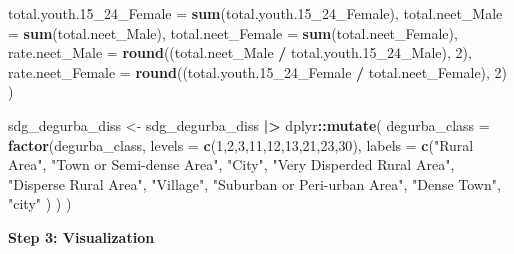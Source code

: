 \documentclass[
]{article}
\newenvironment{Shaded}{\begin{snugshade}}{\end{snugshade}}
\newcommand{\AttributeTok}[1]{\textcolor[rgb]{0.13,0.29,0.53}{#1}}
\newcommand{\DecValTok}[1]{\textcolor[rgb]{0.00,0.00,0.81}{#1}}
\newcommand{\FloatTok}[1]{\textcolor[rgb]{0.00,0.00,0.81}{#1}}
\newcommand{\FunctionTok}[1]{\textcolor[rgb]{0.13,0.29,0.53}{\textbf{#1}}}
\newcommand{\NormalTok}[1]{#1}
\newcommand{\OtherTok}[1]{\textcolor[rgb]{0.56,0.35,0.01}{#1}}
\newcommand{\SpecialCharTok}[1]{\textcolor[rgb]{0.81,0.36,0.00}{\textbf{#1}}}
\newcommand{\StringTok}[1]{\textcolor[rgb]{0.31,0.60,0.02}{#1}}
\newenvironment{UNFPAShadedBox}{%
\begin{tcolorbox}[sharp corners, enhanced, colback=white, boxrule=0pt, borderline west={2pt}{0pt}{orange}]%
}{\end{tcolorbox}}
\newenvironment{Highlighting}{\begin{UNFPAShadedBox}}{\end{UNFPAShadedBox}}
\begin{document}
\begin{Shaded}
\begin{Highlighting}[]
    \AttributeTok{total.youth.15\_24\_Female =} \FunctionTok{sum}\NormalTok{(total.youth}\FloatTok{.15}\NormalTok{\_24\_Female),}
    \AttributeTok{total.neet\_Male =} \FunctionTok{sum}\NormalTok{(total.neet\_Male),}
    \AttributeTok{total.neet\_Female   =} \FunctionTok{sum}\NormalTok{(total.neet\_Female),}
    \AttributeTok{rate.neet\_Male =} \FunctionTok{round}\NormalTok{((total.neet\_Male }\SpecialCharTok{/}\NormalTok{ total.youth}\FloatTok{.15}\NormalTok{\_24\_Male), }\DecValTok{2}\NormalTok{),}
    \AttributeTok{rate.neet\_Female =} \FunctionTok{round}\NormalTok{((total.youth}\FloatTok{.15}\NormalTok{\_24\_Female }\SpecialCharTok{/}\NormalTok{ total.neet\_Female), }\DecValTok{2}\NormalTok{)}
\NormalTok{  )}


\NormalTok{sdg\_degurba\_diss }\OtherTok{\textless{}{-}} 
\NormalTok{  sdg\_degurba\_diss }\SpecialCharTok{|\textgreater{}}
\NormalTok{  dplyr}\SpecialCharTok{::}\FunctionTok{mutate}\NormalTok{(}
    \AttributeTok{degurba\_class =} \FunctionTok{factor}\NormalTok{(degurba\_class, }
                           \AttributeTok{levels =} \FunctionTok{c}\NormalTok{(}\DecValTok{1}\NormalTok{,}\DecValTok{2}\NormalTok{,}\DecValTok{3}\NormalTok{,}\DecValTok{11}\NormalTok{,}\DecValTok{12}\NormalTok{,}\DecValTok{13}\NormalTok{,}\DecValTok{21}\NormalTok{,}\DecValTok{23}\NormalTok{,}\DecValTok{30}\NormalTok{), }
                           \AttributeTok{labels =} \FunctionTok{c}\NormalTok{(}\StringTok{"Rural Area"}\NormalTok{,}
                                      \StringTok{"Town or Semi{-}dense Area"}\NormalTok{,}
                                      \StringTok{"City"}\NormalTok{,}
                                      \StringTok{"Very Disperded Rural Area"}\NormalTok{,}
                                      \StringTok{"Disperse Rural Area"}\NormalTok{,}
                                      \StringTok{"Village"}\NormalTok{,}
                                      \StringTok{"Suburban or Peri{-}urban Area"}\NormalTok{,}
                                      \StringTok{"Dense Town"}\NormalTok{,}
                                      \StringTok{"city"}
\NormalTok{                                      )}
\NormalTok{                           )}
\NormalTok{    )}
\end{Highlighting}
\end{Shaded}

\textbf{Step 3: Visualization}
\end{document}
